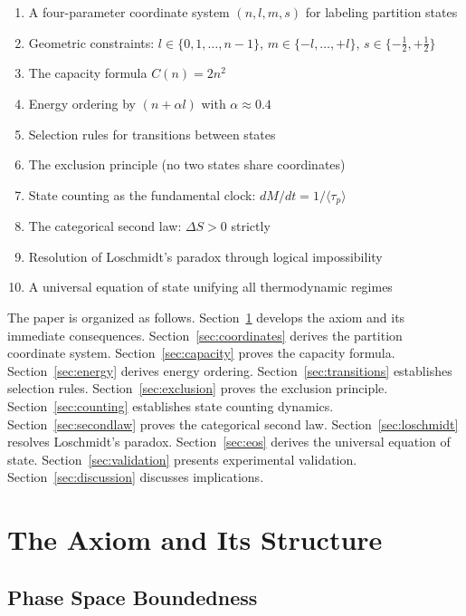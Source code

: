 \documentclass[twocolumn,10pt,a4paper]{article}
\theoremstyle{definition}
\theoremstyle{remark}
\begin{document}
\begin{enumerate}[label=(\roman*)]
    \item A four-parameter coordinate system $(n, l, m, s)$ for labeling partition states
    \item Geometric constraints: $l \in \{0, 1, \ldots, n-1\}$, $m \in \{-l, \ldots, +l\}$, $s \in \{-\frac{1}{2}, +\frac{1}{2}\}$
    \item The capacity formula $C(n) = 2n^2$
    \item Energy ordering by $(n + \alpha l)$ with $\alpha \approx 0.4$
    \item Selection rules for transitions between states
    \item The exclusion principle (no two states share coordinates)
    \item State counting as the fundamental clock: $dM/dt = 1/\langle\tau_p\rangle$
    \item The categorical second law: $\Delta S > 0$ strictly
    \item Resolution of Loschmidt's paradox through logical impossibility
    \item A universal equation of state unifying all thermodynamic regimes
\end{enumerate}

The paper is organized as follows. Section~\ref{sec:axiom} develops the axiom and its immediate consequences. Section~\ref{sec:coordinates} derives the partition coordinate system. Section~\ref{sec:capacity} proves the capacity formula. Section~\ref{sec:energy} derives energy ordering. Section~\ref{sec:transitions} establishes selection rules. Section~\ref{sec:exclusion} proves the exclusion principle. Section~\ref{sec:counting} establishes state counting dynamics. Section~\ref{sec:secondlaw} proves the categorical second law. Section~\ref{sec:loschmidt} resolves Loschmidt's paradox. Section~\ref{sec:eos} derives the universal equation of state. Section~\ref{sec:validation} presents experimental validation. Section~\ref{sec:discussion} discusses implications.

\section{The Axiom and Its Structure}
\label{sec:axiom}

\subsection{Phase Space Boundedness}
\end{document}
